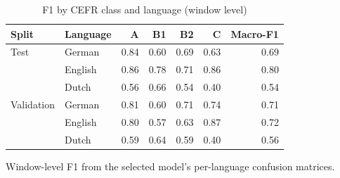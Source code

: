 \begin{table}[htbp]
\centering
\begin{threeparttable}
\caption{F1 by CEFR class and language (window level)}
\label{tab:clf-f1-lang}
\begin{tabular}{llrrrrr}
\hline
Split & Language & A & B1 & B2 & C & Macro-F1 \\
\hline
Test & German & 0.84 & 0.60 & 0.69 & 0.63 & 0.69 \\
 & English & 0.86 & 0.78 & 0.71 & 0.86 & 0.80 \\
 & Dutch & 0.56 & 0.66 & 0.54 & 0.40 & 0.54 \\
\hline
Validation & German & 0.81 & 0.60 & 0.71 & 0.74 & 0.71 \\
 & English & 0.80 & 0.57 & 0.63 & 0.87 & 0.72 \\
 & Dutch & 0.59 & 0.64 & 0.59 & 0.40 & 0.56 \\
\hline
\end{tabular}
\begin{tablenotes}
\footnotesize
\item Window-level F1 from the selected model's per-language confusion matrices.
\end{tablenotes}
\end{threeparttable}
\end{table}
